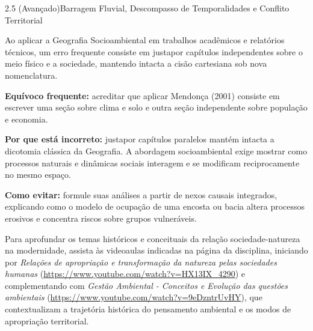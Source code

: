 \begin{boxExemplo}{2.5 (Avançado)}{Barragem Fluvial, Descompasso de Temporalidades e Conflito Territorial}
\end{boxExemplo}


Ao aplicar a Geografia Socioambiental em trabalhos acadêmicos e relatórios técnicos, um erro frequente consiste em justapor capítulos independentes sobre o meio físico e a sociedade, mantendo intacta a cisão cartesiana sob nova nomenclatura.

\begin{boxErro}
\textbf{Equívoco frequente:} acreditar que aplicar Mendonça (2001) consiste em escrever uma seção sobre clima e solo e outra seção independente sobre população e economia.

\textbf{Por que está incorreto:} justapor capítulos paralelos mantém intacta a dicotomia clássica da Geografia. A abordagem socioambiental exige mostrar como processos naturais e dinâmicas sociais interagem e se modificam reciprocamente no mesmo espaço.

\textbf{Como evitar:} formule suas análises a partir de nexos causais integrados, explicando como o modelo de ocupação de uma encosta ou bacia altera processos erosivos e concentra riscos sobre grupos vulneráveis.
\end{boxErro}

Para aprofundar os temas históricos e conceituais da relação sociedade-natureza na modernidade, assista às videoaulas indicadas na página da disciplina, iniciando por \textit{Relações de apropriação e transformação da natureza pelas sociedades humanas} (\url{https://www.youtube.com/watch?v=HX13IX_4290}) e complementando com \textit{Gestão Ambiental - Conceitos e Evolução das questões ambientais} (\url{https://www.youtube.com/watch?v=9eDzntrUvHY}), que contextualizam a trajetória histórica do pensamento ambiental e os modos de apropriação territorial.

